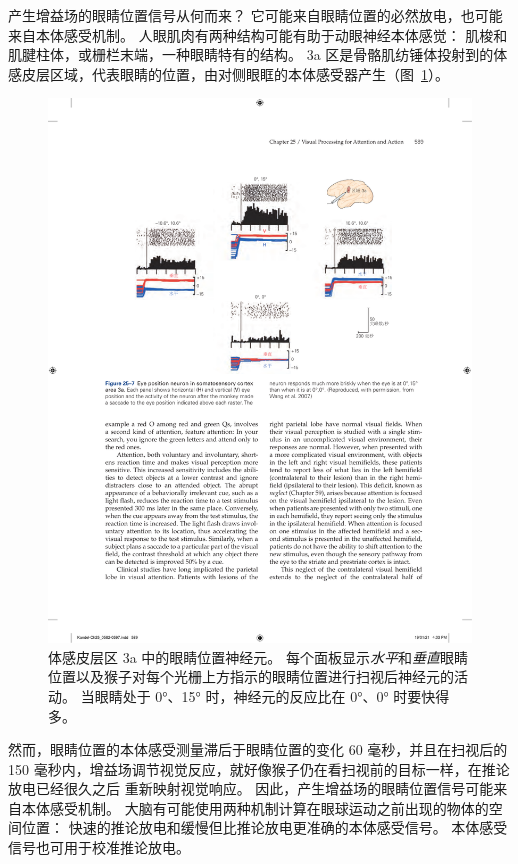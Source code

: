 产生增益场的眼睛位置信号从何而来？
它可能来自眼睛位置的必然放电，也可能来自本体感受机制。
人眼肌肉有两种结构可能有助于动眼神经本体感觉：
肌梭和肌腱柱体，或栅栏末端，一种眼睛特有的结构。
3a 区是骨骼肌纺锤体投射到的体感皮层区域，代表眼睛的位置，由对侧眼眶的本体感受器产生（图~\ref{fig:25_7}）。


\begin{figure}[htbp]
	\centering
	\includegraphics[width=1.0\linewidth]{chap25/fig_25_7}
	\caption{体感皮层区 3a 中的眼睛位置神经元。
		每个面板显示\textit{水平}和\textit{垂直}眼睛位置以及猴子对每个光栅上方指示的眼睛位置进行扫视后神经元的活动。
		当眼睛处于 0°、15° 时，神经元的反应比在 0°、0° 时要快得多。}
	\label{fig:25_7}
\end{figure}


然而，眼睛位置的本体感受测量滞后于眼睛位置的变化 60 毫秒，并且在扫视后的 150 毫秒内，增益场调节视觉反应，就好像猴子仍在看扫视前的目标一样，在推论放电已经很久之后 重新映射视觉响应。
因此，产生增益场的眼睛位置信号可能来自本体感受机制。
大脑有可能使用两种机制计算在眼球运动之前出现的物体的空间位置：
快速的推论放电和缓慢但比推论放电更准确的本体感受信号。
本体感受信号也可用于校准推论放电。



